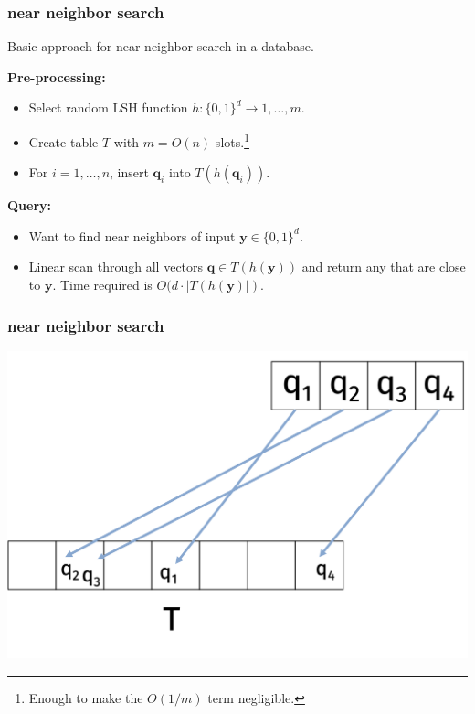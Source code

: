 \documentclass[compress]{beamer}
\newcommand{\bv}[1]{\mathbf{#1}}
\begin{document}
\begin{frame}
	\frametitle{near neighbor search}
	\begin{center}
	Basic approach for near neighbor search in a database.
	\end{center}
		\textbf{Pre-processing:}
	\begin{itemize}
		\item Select random LSH function $h: \{0,1\}^d \rightarrow 1,\ldots, m$.
		\item Create table $T$ with $m = O(n)$ slots.\footnote{Enough to make the $O(1/m)$ term negligible.}
		\item For $i = 1,\ldots, n$, insert $\bv{q}_i$ into $T(h(\bv{q}_i))$.
	\end{itemize}
	\textbf{Query:}
	\begin{itemize}
		\item Want to find near neighbors of input $\bv{y}\in\{0,1\}^d$.
		\item Linear scan through all vectors $\bv{q}\in T(h(\bv{y}))$ and return any that are close to $\bv{y}$. Time required is $O(d\cdot |T(h(\bv{y})|)$.
	\end{itemize}
\vspace{1em}
\end{frame}

\begin{frame}
	\frametitle{near neighbor search}
	\begin{center}
		\includegraphics[width=.8\textwidth]{basicScheme.png}
	\end{center}
\end{frame}
\end{document}
